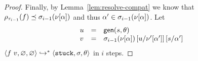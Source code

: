 \begin{proof}
  Finally, by Lemma~\ref{lem:resolve-compat} we know that
  $\vsub{\ptype{\trace_{i-1}}{f}}{\resolve{\vhole{\thole}}{\vsu_{i-1}}}$
  and thus $\thole' \in \resolve{\vhole{\thole}}{\vsu_{i-1}}$.
  Let
  $$
  \begin{array}{lcl}
  u &=& \gen{s}{\tsu} \\
  v &=& \resolve{\vhole{\thole}}{\vsu_{i-1}}\sub{\ehole'[\thole']}{u}\sub{\thole'}{s} \\
  \end{array}
  $$
  $\steps{\eapp{f}{v}}{\emptysu}{\emptysu}{\stuck}{\vsu}{\tsu}$ in $i$ steps.
\end{proof}

